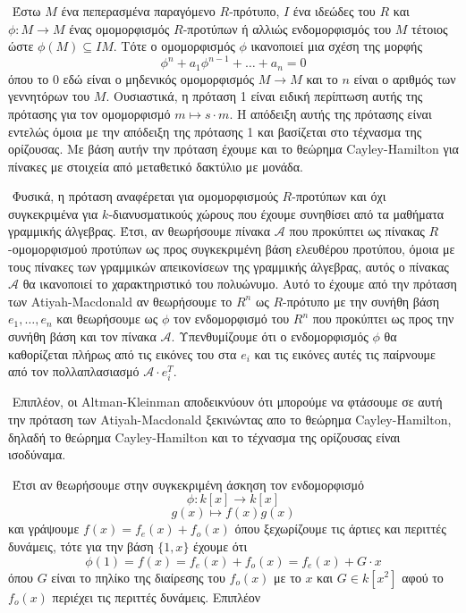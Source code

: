\documentclass[oneside,a4paper]{article}
\newcommand {\tl}{\textlatin}
\begin{document}
$ $\newline
Έστω $M$ ένα πεπερασμένα παραγόμενο $R$-πρότυπο, $I$ ένα ιδεώδες του $R$ και $\phi : M \rightarrow M$ ένας ομομορφισμός $R$-προτύπων ή αλλιώς ενδομορφισμός του $M$ τέτοιος ώστε $\phi(M) \subseteq IM$. Τότε ο ομομορφισμός $\phi$ ικανοποιεί μια σχέση της μορφής $$\phi^n + a_1 \phi^{n-1} + \ldots + a_n = 0$$ όπου το $0$ εδώ είναι ο μηδενικός ομομορφισμός $M \rightarrow M$ και το $n$ είναι ο αριθμός των γεννητόρων του $M$. Ουσιαστικά, η πρόταση 1 είναι ειδική περίπτωση αυτής της πρότασης για τον ομομορφισμό $m \mapsto s\cdot m$. Η απόδειξη αυτής της πρότασης είναι εντελώς όμοια με την απόδειξη της πρότασης 1 και βασίζεται στο τέχνασμα της ορίζουσας. Με βάση αυτήν την πρόταση έχουμε και το θεώρημα \tl{Cayley-Hamilton} για πίνακες με στοιχεία από μεταθετικό δακτύλιο με μονάδα. 

$ $\newline
Φυσικά, η πρόταση αναφέρεται για ομομορφισμούς $R$-προτύπων και όχι συγκεκριμένα για $k$-διανυσματικούς χώρους που έχουμε συνηθίσει από τα μαθήματα γραμμικής άλγεβρας. Έτσι, αν θεωρήσουμε πίνακα $\mathcal{A}$ που προκύπτει ως πίνακας $R$-ομομορφισμού προτύπων ως προς συγκεκριμένη βάση ελευθέρου προτύπου, όμοια με τους πίνακες των γραμμικών απεικονίσεων της γραμμικής άλγεβρας, αυτός ο πίνακας $\mathcal{A}$ θα ικανοποιεί το χαρακτηριστικό του πολυώνυμο. Αυτό το έχουμε από την πρόταση των \tl{Atiyah-Macdonald} αν θεωρήσουμε το $R^n$ ως $R$-πρότυπο με την συνήθη βάση $e_1,\ldots,e_n$ και θεωρήσουμε ως $\phi$ τον ενδομορφισμό του $R^n$ που προκύπτει ως προς την συνήθη βάση και τον πίνακα $\mathcal{A}$. Υπενθυμίζουμε ότι ο ενδομορφισμός $\phi$ θα καθορίζεται πλήρως από τις εικόνες του στα $e_i$ και τις εικόνες αυτές τις παίρνουμε από τον πολλαπλασιασμό $\mathcal{A} \cdot e^{T}_i$.

$ $\newline
Επιπλέον, οι \tl{Altman-Kleinman} αποδεικνύουν ότι μπορούμε να φτάσουμε σε αυτή την πρόταση των \tl{Atiyah-Macdonald} ξεκινώντας απο το θεώρημα \tl{Cayley-Hamilton}, δηλαδή το θεώρημα \tl{Cayley-Hamilton} και το τέχνασμα της ορίζουσας είναι ισοδύναμα.


$ $\newline
Έτσι αν θεωρήσουμε στην συγκεκριμένη άσκηση τον ενδομορφισμό $$\phi : k[x] \rightarrow k[x]$$
$$g(x) \mapsto f(x)g(x)$$ και γράψουμε $f(x) = f_e (x) + f_o(x)$ όπου ξεχωρίζουμε τις άρτιες και περιττές δυνάμεις, τότε για την βάση $\{1,x\}$ έχουμε ότι 
$$\phi(1) = f(x) = f_e(x) + f_o(x) = f_e (x) + G \cdot x $$
όπου $G$ είναι το πηλίκο της διαίρεσης του $f_o(x)$ με το $x$ και $G \in k[x^2]$ αφού το $f_o(x)$ περιέχει τις περιττές δυνάμεις. Επιπλέον
\end{document}

